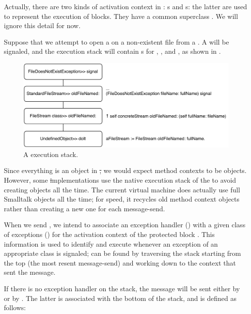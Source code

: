 \documentclass[a4paper,10pt,twoside]{book}
\begin{document}
Actually, there are two kinds of activation context in \pharo: s and s: the latter are used to represent the execution of blocks.  They have a common superclass .  We will ignore this detail for now.

Suppose that we attempt to open a  on a non-existent file from a .
A  will be signaled, and the execution stack will contain s for , , and , as shown in .

\begin{figure}[bth]\centering
        \includegraphics[width=\linewidth]{Stack}
        \caption{A \pharo execution stack.}
\end{figure}

Since everything is an object in \st, we would expect method contexts to be objects.
However, some \st implementations use the native  execution stack of the  to avoid creating objects all the time.
The current \pharo virtual machine does actually use full Smalltalk objects all the time;  for speed, it recycles old method context objects rather than creating a new one for each message-send.

When we send , we intend to associate an exception handler () with a given class of exceptions () for the activation context of the protected block .
This information is used to identify and execute  whenever an exception of an appropriate class is signaled;  can be found by traversing the stack starting from the top (the most resent message-send) and working down to the context that sent the  message.

If there is no exception handler on the stack, the message  will be sent either by  or by . The latter is associated with the bottom of the stack, and is defined as follows:
\end{document}
